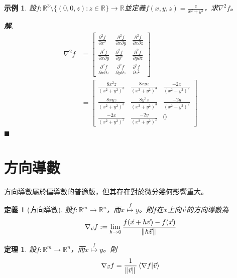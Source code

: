 \documentclass[12pt]{article}
\newtheorem{definition}{定義}
\newtheorem*{theorem}{定理}
\newtheorem*{example}{示例}
\newenvironment*{sol}{\par \textbf{解}.}{\hfill$\blacksquare$}
\begin{document}
    \begin{example}
        設$f:\mathbb{R}^3\setminus\{(0,0,z):z\in\mathbb{R}\}\to\mathbb{R}$並定義$f(x,y,z)=\frac{z}{x^2+y^2}$，求$\nabla^2 f$。

        \begin{sol}
            \begin{align*}
                \nabla^2 f&=\begin{bmatrix}
                    \frac{\partial^2 f}{\partial x^2}&\frac{\partial^2 f}{\partial x \partial y}&\frac{\partial^2 f}{\partial x \partial z}\\
                    \frac{\partial^2 f}{\partial x \partial y}&\frac{\partial^2 f}{\partial y^2}&\frac{\partial^2 f}{\partial y \partial z}\\
                    \frac{\partial^2 f}{\partial x \partial z}&\frac{\partial^2 f}{\partial y \partial z}&\frac{\partial^2 f}{\partial z^2}
                \end{bmatrix}\\
                &=\begin{bmatrix}
                    \frac{8x^2z}{(x^2+y^2)^3}&\frac{8xyz}{(x^2+y^2)^3}&\frac{-2x}{(x^2+y^2)^2}\\
                    \frac{8xyz}{(x^2+y^2)^3}&\frac{8y^2z}{(x^2+y^2)^3}&\frac{-2y}{(x^2+y^2)^2}\\
                    \frac{-2x}{(x^2+y^2)^2}&\frac{-2y}{(x^2+y^2)^2}&0
                \end{bmatrix}
            \end{align*}
        \end{sol}
    \end{example}

    \section*{方向導數}

    方向導數屬於偏導數的普適版，但其存在對於微分幾何影響重大。

    \begin{definition}[方向導數]
        設$f:\mathbb{R}^m\to\mathbb{R}^n$，而$x\overset{f}{\mapsto}y$。則$f$在$x$上向$\vec{v}$的方向導數為\begin{align*}
            \nabla_{\vec{v}}f:=\lim_{h\to 0}\frac{f(\vec{x}+h\vec{v})-f(\vec{x})}{\norm*{h\vec{v}}}
        \end{align*}
    \end{definition}

    \begin{theorem}
        設$f:\mathbb{R}^m\to\mathbb{R}^n$，而$x\overset{f}{\mapsto}y$。則\begin{align*}
            \nabla_{\vec{v}}f=\frac{1}{\norm*{\vec{v}}}\innerproduct{\nabla f}{\vec{v}}
        \end{align*}
    \end{theorem}
\end{document}
